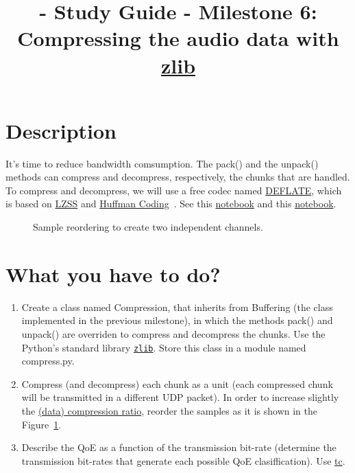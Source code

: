 
\title{\TM - Study Guide - Milestone 6: Compressing the audio data with \href{https://zlib.net/}{zlib}}

\maketitle

\section{Description}

It's time to reduce bandwidth comsumption. The pack() and the unpack()
methods can compress and decompress, respectively, the chunks that are
handled. To compress and decompress, we will use a free codec named
\href{https://en.wikipedia.org/wiki/DEFLATE}{DEFLATE}, which is based
on
\href{https://en.wikipedia.org/wiki/Lempel%E2%80%93Ziv%E2%80%93Storer%E2%80%93Szymanski}{LZSS}
  and \href{https://en.wikipedia.org/wiki/Huffman_coding}{Huffman
    Coding}~\cite{nelson96datacompression}. See this
  \href{https://github.com/vicente-gonzalez-ruiz/LZ77}{notebook} and
  this
  \href{https://vicente-gonzalez-ruiz.github.io/Huffman_coding/}{notebook}.

\begin{figure}
  \begin{center}
  \end{center}
  \caption{Sample reordering to create two independent channels.}
  \label{fig:reordering}
\end{figure}

\section{What you have to do?}

\begin{enumerate}
  
\item Create a class named Compression, that inherits from
  Buffering (the class implemented in the previous milestone),
  in which the methods pack() and unpack() are
  overriden to compress and decompress the chunks. Use the Python's
  standard library
  \href{https://docs.python.org/3/library/zlib.html}{\texttt{zlib}}. Store
  this class in a module named compress.py.
  
\item Compress (and decompress) each chunk as a unit (each compressed
  chunk will be transmitted in a different UDP packet). In order to
  increase slightly the
  \href{https://en.wikipedia.org/wiki/Data_compression_ratio}{(data)
    compression ratio}, reorder the samples as it is shown in the
  Figure~\ref{fig:reordering}.

\item Describe the QoE as a function of the transmission bit-rate
  (determine the transmission bit-rates that generate each possible
  QoE clasiffication). Use
  \href{https://man7.org/linux/man-pages/man8/tc.8.html}{tc}.
\end{enumerate}

